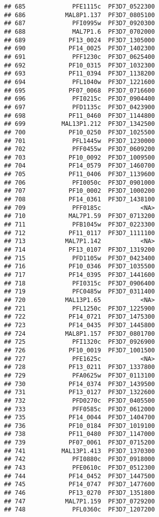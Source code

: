 \documentclass{article}\usepackage[]{graphicx}\usepackage[]{color}
\makeatletter
\newenvironment{kframe}{%
 \def\at@end@of@kframe{}%
 \ifinner\ifhmode%
  \def\at@end@of@kframe{\end{minipage}}%
  \begin{minipage}{\columnwidth}%
 \fi\fi%
 \def\FrameCommand##1{\hskip\@totalleftmargin \hskip-\fboxsep
 \colorbox{shadecolor}{##1}\hskip-\fboxsep
     \hskip-\linewidth \hskip-\@totalleftmargin \hskip\columnwidth}%
 \MakeFramed {\advance\hsize-\width
   \@totalleftmargin\z@ \linewidth\hsize
   \@setminipage}}%
 {\par\unskip\endMakeFramed%
 \at@end@of@kframe}
\newenvironment{knitrout}{}{} %
\makeatother
\begin{document}
\begin{knitrout}
\begin{kframe}
\begin{verbatim}
## 685             PFE1115c  PF3D7_0522300
## 686           MAL8P1.137  PF3D7_0805100
## 687             PFI0995w  PF3D7_0920300
## 688             MAL7P1.6  PF3D7_0702000
## 689            PF13_0024  PF3D7_1305000
## 690            PF14_0025  PF3D7_1402300
## 691             PFF1230c  PF3D7_0625400
## 692            PF10_0315  PF3D7_1032300
## 693            PF11_0394  PF3D7_1138200
## 694             PFL1040w  PF3D7_1221600
## 695            PF07_0068  PF3D7_0716600
## 696             PFI0215c  PF3D7_0904400
## 697             PFD1135c  PF3D7_0423900
## 698            PF11_0460  PF3D7_1144800
## 699          MAL13P1.212  PF3D7_1342500
## 700            PF10_0250  PF3D7_1025500
## 701             PFL1445w  PF3D7_1230000
## 702             PFF0455w  PF3D7_0609200
## 703            PF10_0092  PF3D7_1009500
## 704            PF14_0579  PF3D7_1460700
## 705            PF11_0406  PF3D7_1139600
## 706             PFI0050c  PF3D7_0901000
## 707            PF10_0002  PF3D7_1000200
## 708            PF14_0361  PF3D7_1438100
## 709             PFF0185c           <NA>
## 710            MAL7P1.59  PF3D7_0713200
## 711             PFB1045w  PF3D7_0223300
## 712            PF11_0117  PF3D7_1111100
## 713           MAL7P1.142           <NA>
## 714            PF13_0107  PF3D7_1319200
## 715             PFD1105w  PF3D7_0423400
## 716            PF10_0346  PF3D7_1035500
## 717            PF14_0395  PF3D7_1441600
## 718             PFI0315c  PF3D7_0906400
## 719             PFC0485w  PF3D7_0311400
## 720           MAL13P1.65           <NA>
## 721             PFL1250c  PF3D7_1225900
## 722            PF14_0721  PF3D7_1475300
## 723            PF14_0435  PF3D7_1445800
## 724           MAL8P1.157  PF3D7_0801700
## 725             PFI1320c  PF3D7_0926900
## 726            PF10_0019  PF3D7_1001500
## 727             PFE1625c           <NA>
## 728            PF13_0211  PF3D7_1337800
## 729             PFA0625w  PF3D7_0113100
## 730            PF14_0374  PF3D7_1439500
## 731            PF13_0127  PF3D7_1322600
## 732             PFD0270c  PF3D7_0405500
## 733             PFF0585c  PF3D7_0612000
## 735            PF14_0044  PF3D7_1404700
## 736            PF10_0184  PF3D7_1019100
## 738            PF11_0480  PF3D7_1147000
## 739            PF07_0061  PF3D7_0715200
## 741          MAL13P1.413  PF3D7_1370300
## 742             PFI0880c  PF3D7_0918000
## 743             PFE0610c  PF3D7_0512300
## 744            PF14_0452  PF3D7_1447500
## 745            PF14_0747  PF3D7_1477600
## 746            PF13_0270  PF3D7_1351800
## 747           MAL7P1.159  PF3D7_0729200
## 748             PFL0360c  PF3D7_1207200

\end{verbatim}
\end{kframe}
\end{knitrout}
\end{document}
